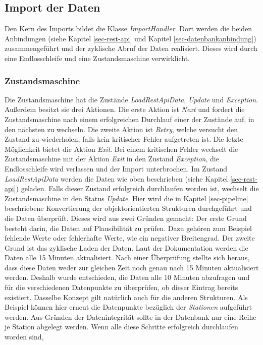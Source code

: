\subsection{Import der Daten}
Den Kern des Imports bildet die Klasse \textit{ImportHandler}. Dort werden die beiden Anbindungen (siehe Kapitel \ref{sec-rest-api} und Kapitel \ref{sec-datenbankanbindung}) zusammengeführt und der zyklische Abruf der Daten realisiert.
Dieses wird durch eine Endlosschleife und eine Zustandsmaschine verwirklicht. 
\subsubsection{Zustandsmaschine}
\label{sec-zustandsmaschine}
Die Zustandsmaschine hat die Zustände \textit{LoadRestApiData}, \textit{Update} und \textit{Exception}.
Außerdem besitzt sie drei Aktionen. Die erste Aktion ist \textit{Next} und fordert die Zustandsmaschine nach einem erfolgreichen Durchlauf einer der Zustände auf, in den nächsten zu wechseln.
Die zweite Aktion ist \textit{Retry}, welche versucht den Zustand zu wiederholen, falls kein kritischer Fehler aufgetreten ist.
Die letzte Möglichkeit bietet die Aktion \textit{Exit}. Bei einem kritischen Fehler wechselt die Zustandsmaschine mit der Aktion \textit{Exit} in den Zustand \textit{Exception}, die Endlosschleife wird verlassen und der Import unterbrochen.
Im Zustand \textit{LoadRestApiData} werden die Daten wie oben beschrieben (siehe Kapitel \ref{sec-rest-api}) geladen. Falls dieser Zustand erfolgreich durchlaufen worden ist,
wechselt die Zustandsmaschine in den Status \textit{Update}. Hier wird die in Kapitel \ref{sec-pipeline} beschriebene Konvertierung der objektorientierten Strukturen durchgeführt 
und die Daten überprüft. Dieses wird aus zwei Gründen gemacht: Der erste Grund besteht darin, die Daten auf Plausibilität zu prüfen. Dazu gehören zum Beispiel
fehlende Werte oder fehlerhafte Werte, wie ein negativer Breitengrad. Der zweite Grund ist das zyklische Laden der Daten.
Laut der Dokumentation werden die Daten alle 15 Minuten aktualisiert. Nach einer Überprüfung stellte sich heraus,
dass diese Daten weder zur gleichen Zeit noch genau nach 15 Minuten aktualisiert werden. Deshalb wurde entschieden, die
Daten alle 10 Minuten abzufragen und für die verschiedenen Datenpunkte zu überprüfen, ob dieser Eintrag bereits existiert.
Dasselbe Konzept gilt natürlich auch für die anderen Strukturen. Als Beispiel können hier erneut die Datenpunkte bezüglich der \textit{Stationen} aufgeführt werden.
Aus Gründen der Datenintegrität sollte in der Datenbank nur eine Reihe je Station abgelegt werden. Wenn alle diese Schritte erfolgreich durchlaufen worden sind,
